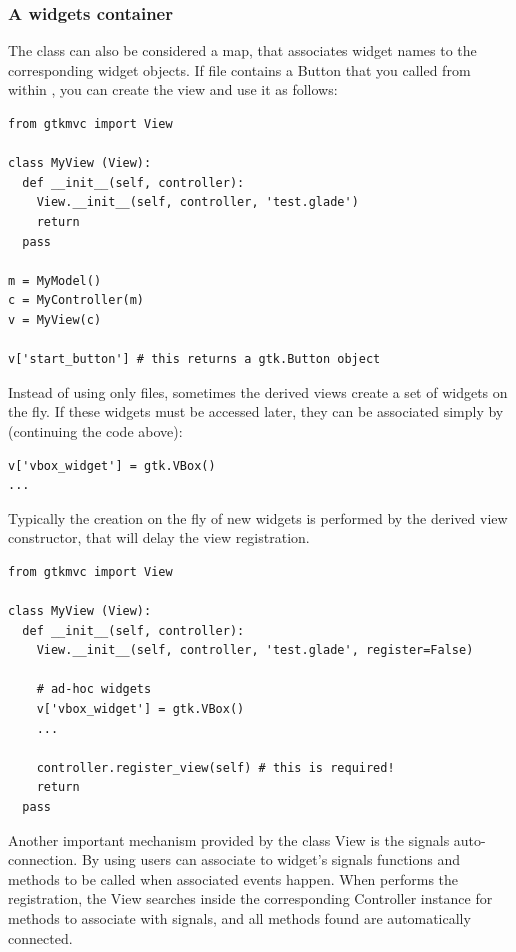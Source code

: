 \subsubsection{\label{VIEW:MANUAL}A widgets container}

The  class can also be considered a map, that
associates widget names to the corresponding widget objects. If file
 contains a Button that you called
 from within \glade, you can create the view
and use it as follows:

{ \codesize 
\begin{verbatim}
from gtkmvc import View

class MyView (View):
  def __init__(self, controller):
    View.__init__(self, controller, 'test.glade')
    return
  pass 

m = MyModel()
c = MyController(m)
v = MyView(c)

v['start_button'] # this returns a gtk.Button object
\end{verbatim}
}

Instead of using only \glade files, sometimes the derived views create
a set of widgets on the fly. If these widgets must be accessed later,
they can be associated simply by (continuing the code above):

{ \codesize 
\begin{verbatim}
v['vbox_widget'] = gtk.VBox()
...
\end{verbatim}
}

Typically the creation on the fly of new widgets is performed by the
derived view constructor, that will delay the view registration.

{ \codesize 
\begin{verbatim}
from gtkmvc import View

class MyView (View):
  def __init__(self, controller):
    View.__init__(self, controller, 'test.glade', register=False)
 
    # ad-hoc widgets
    v['vbox_widget'] = gtk.VBox()
    ...

    controller.register_view(self) # this is required!
    return
  pass 
\end{verbatim}
}


Another important mechanism provided by the class View is the signals
auto-connection. By using \glade users can associate to widget's
signals functions and methods to be called when associated events
happen.  When performs the registration, the View searches inside the
corresponding Controller instance for methods to associate with
signals, and all methods found are automatically connected.


